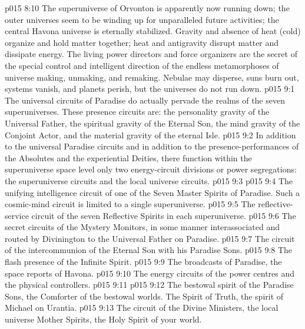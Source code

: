 \vs p015 8:10 The superuniverse of Orvonton is apparently now running down; the outer universes seem to be winding up for unparalleled future activities; the central Havona universe is eternally stabilized. Gravity and absence of heat (cold) organize and hold matter together; heat and antigravity disrupt matter and dissipate energy. The living power directors and force organizers are the secret of the special control and intelligent direction of the endless metamorphoses of universe making, unmaking, and remaking. Nebulae may disperse, suns burn out, systems vanish, and planets perish, but the universes do not run down.
\vs p015 9:1 The universal circuits of Paradise do actually pervade the realms of the seven superuniverses. These presence circuits are: the personality gravity of the Universal Father, the spiritual gravity of the Eternal Son, the mind gravity of the Conjoint Actor, and the material gravity of the eternal Isle.
\vs p015 9:2 In addition to the universal Paradise circuits and in addition to the presence\hyp{}performances of the Absolutes and the experiential Deities, there function within the superuniverse space level only two energy\hyp{}circuit divisions or power segregations: the superuniverse circuits and the local universe circuits.
\vs p015 9:3 \pc {}
\vs p015 9:4 \bibnobreakspace The unifying intelligence circuit of one of the Seven Master Spirits of Paradise. Such a cosmic\hyp{}mind circuit is limited to a single superuniverse.
\vs p015 9:5 \bibnobreakspace The reflective\hyp{}service circuit of the seven Reflective Spirits in each superuniverse.
\vs p015 9:6 \bibnobreakspace The secret circuits of the Mystery Monitors, in some manner interassociated and routed by Divinington to the Universal Father on Paradise.
\vs p015 9:7 \bibnobreakspace The circuit of the intercommunion of the Eternal Son with his Paradise Sons.
\vs p015 9:8 \bibnobreakspace The flash presence of the Infinite Spirit.
\vs p015 9:9 \bibnobreakspace The broadcasts of Paradise, the space reports of Havona.
\vs p015 9:10 \bibnobreakspace The energy circuits of the power centres and the physical controllers.
\vs p015 9:11 \pc {}
\vs p015 9:12 \bibnobreakspace The bestowal spirit of the Paradise Sons, the Comforter of the bestowal worlds. The Spirit of Truth, the spirit of Michael on Urantia.
\vs p015 9:13 \bibnobreakspace The circuit of the Divine Ministers, the local universe Mother Spirits, the Holy Spirit of your world.
